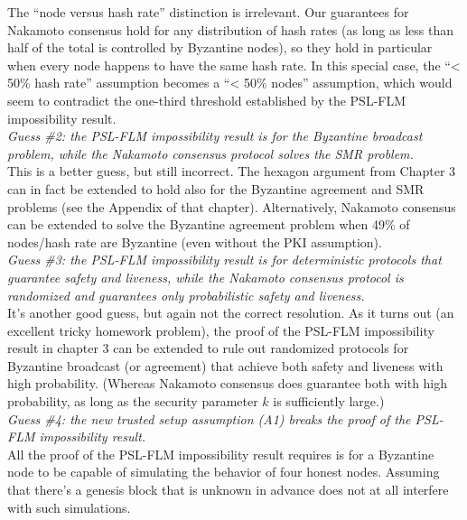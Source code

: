 The “node versus hash rate” distinction is irrelevant. Our guarantees for Nakamoto consensus
hold for any distribution of hash rates (as long as less than half of the total is controlled by
Byzantine nodes), so they hold in particular when every node happens to have the
same hash rate. In this special case, the “< 50\% hash rate” assumption becomes a “< 50\%
nodes” assumption, which would seem to contradict the one-third threshold established by
the PSL-FLM impossibility result.\\

\textit{Guess \#2: the PSL-FLM impossibility result is for the Byzantine broadcast problem,
while the Nakamoto consensus protocol solves the SMR problem.}\\

This is a better guess, but still incorrect. The hexagon argument from Chapter 3 can in
fact be extended to hold also for the Byzantine agreement and SMR problems (see the
Appendix of that chapter). Alternatively, Nakamoto consensus can be extended to solve the
Byzantine agreement problem when 49\% of nodes/hash rate are Byzantine (even without the
PKI assumption).\\

\textit{Guess \#3: the PSL-FLM impossibility result is for deterministic protocols that guarantee safety and liveness, while the Nakamoto consensus protocol is randomized and
guarantees only probabilistic safety and liveness.}\\

It's another good guess, but again not the correct resolution. As it turns out (an excellent
tricky homework problem), the proof of the PSL-FLM impossibility result in chapter 3 can
be extended to rule out randomized protocols for Byzantine broadcast (or agreement) that
achieve both safety and liveness with high probability. (Whereas Nakamoto consensus does
guarantee both with high probability, as long as the security parameter $k$ is sufficiently
large.)\\

\textit{Guess \#4: the new trusted setup assumption (A1) breaks the proof of the PSL-FLM
impossibility result.}\\

All the proof of the PSL-FLM impossibility result requires is for a Byzantine node to be
capable of simulating the behavior of four honest nodes. Assuming that there’s a genesis
block that is unknown in advance does not at all interfere with such simulations.\\

